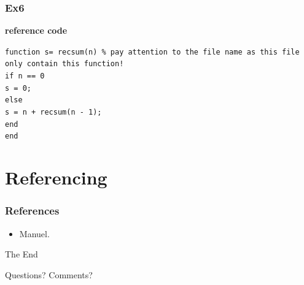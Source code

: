 \documentclass[
	11pt, %
]{beamer}
\begin{document}
\begin{frame}
	\frametitle{Ex6}
    \textbf{reference code}

    \bigskip

    \texttt{function s= recsum(n) \% pay attention to the file name as this file only contain this function!}
    \\\quad \texttt{if n == 0}
    \\\quad  \quad \texttt{s = 0;}
    \\\quad   \texttt{else}
    \\\quad  \quad \texttt{s = n + recsum(n - 1); }
    \\\quad   \texttt{end}
\\\texttt{end}

\end{frame}

\section{Referencing}

\begin{frame} 
	\frametitle{References}
	
	\begin{itemize}
        \item Manuel.
    \end{itemize}
\end{frame}


\begin{frame}[plain] %
	\begin{center}
		{\Huge The End}
		
		\bigskip\bigskip %
		
		{\LARGE Questions? Comments?}
	\end{center}
\end{frame}

\end{document}
